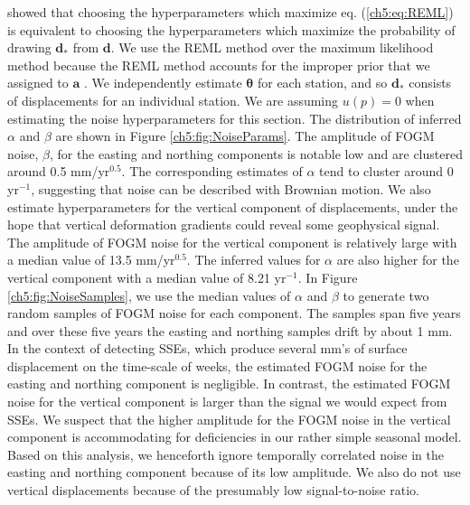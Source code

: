 \citet{Harville1974} showed that choosing the hyperparameters which maximize eq. (\ref{ch5:eq:REML}) is equivalent to choosing the hyperparameters which maximize the probability of drawing $\mathbf{d}_*$ from $\mathbf{d}$. We use the REML method over the maximum likelihood method \citep[e.g.,][]{Langbein1997} because the REML method accounts for the improper prior that we assigned to $\mathbf{a}$ \citep{Hines2017}. We independently estimate $\mathbf{\theta}$ for each station, and so $\mathbf{d}_*$ consists of displacements for an individual station. We are assuming $u(p)=0$ when estimating the noise hyperparameters for this section. The distribution of inferred $\alpha$ and $\beta$ are shown in Figure \ref{ch5:fig:NoiseParams}. The amplitude of FOGM noise, $\beta$, for the easting and northing components is notable low and are clustered around 0.5 mm/yr$^{0.5}$. The corresponding estimates of $\alpha$ tend to cluster around 0 yr$^{-1}$, suggesting that noise can be described with Brownian motion. We also estimate hyperparameters for the vertical component of displacements, under the hope that vertical deformation gradients could reveal some geophysical signal. The amplitude of FOGM noise for the vertical component is relatively large with a median value of 13.5 mm/yr$^{0.5}$.  The inferred values for $\alpha$ are also higher for the vertical component with a median value of 8.21 yr$^{-1}$. In Figure \ref{ch5:fig:NoiseSamples}, we use the median values of $\alpha$ and $\beta$ to generate two random samples of FOGM noise for each component. The samples span five years and over these five years the easting and northing samples drift by about 1 mm. In the context of detecting SSEs, which produce several mm's of surface displacement on the time-scale of weeks, the estimated FOGM noise for the easting and northing component is negligible. In contrast, the estimated FOGM noise for the vertical component is larger than the signal we would expect from SSEs. We suspect that the higher amplitude for the FOGM noise in the vertical component is accommodating for deficiencies in our rather simple seasonal model. Based on this analysis, we henceforth ignore temporally correlated noise in the easting and northing component because of its low amplitude. We also do not use vertical displacements because of the presumably low signal-to-noise ratio.

